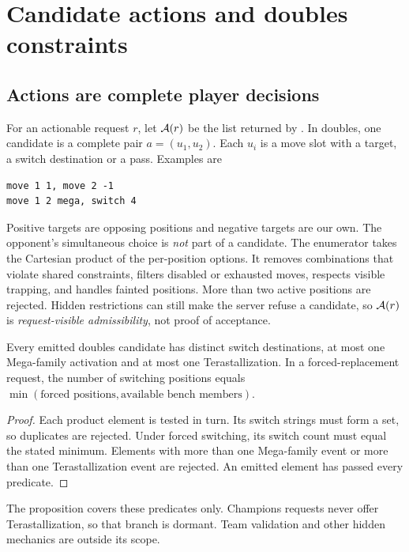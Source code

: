 \section{Candidate actions and doubles constraints}
\label{sec:actions}

\subsection{Actions are complete player decisions}
For an actionable request $r$, let $\mathcal{A}(r)$ be the list returned by
. In doubles, one candidate is a complete pair
$a=(u_1,u_2)$. Each $u_i$ is a move slot with a target, a switch destination
or a pass. Examples are
\begin{lstlisting}
move 1 1, move 2 -1
move 1 2 mega, switch 4
\end{lstlisting}
Positive targets are opposing positions and negative targets are our own. The
opponent's simultaneous choice is \emph{not} part of a candidate. The
enumerator takes the Cartesian product of the per-position options. It
removes combinations that violate shared constraints, filters disabled or
exhausted moves, respects visible trapping, and handles fainted positions.
More than two active positions are rejected. Hidden restrictions can still
make the server refuse a candidate, so $\mathcal{A}(r)$ is \emph{request-visible
admissibility}, not proof of acceptance.

\begin{proposition}
\label{prop:joint}
Every emitted doubles candidate has distinct switch destinations, at most one
Mega-family activation and at most one Terastallization. In a
forced-replacement request, the number of switching positions equals
$\min(\text{forced positions},\text{available bench members})$.
\end{proposition}
\begin{proof}
Each product element is tested in turn. Its switch strings must form a set,
so duplicates are rejected. Under forced switching, its switch count must
equal the stated minimum. Elements with more than one Mega-family event or
more than one Terastallization event are rejected. An emitted element has
passed every predicate.
\end{proof}

The proposition covers these predicates only. Champions requests never offer
Terastallization, so that branch is dormant. Team validation and other hidden
mechanics are outside its scope.


